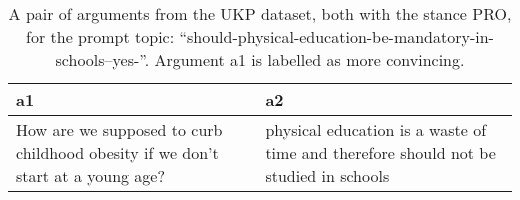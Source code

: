 \begin{table}
\centering
\caption{A pair of arguments from the UKP dataset, both with the stance PRO, for the prompt topic: ``should-physical-education-be-mandatory-in-schools--yes-''. Argument a1 is labelled as more convincing.}
\begin{tabular}{p{6cm}|p{6cm}}
\toprule
                                                                              a1 &                                                                                    a2 \\
\midrule
 How are we supposed to curb childhood obesity if we don't start at a young age? &  physical education is a waste of time and therefore should not be studied in schools \\
\bottomrule
\end{tabular}
\end{table}
